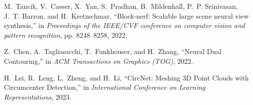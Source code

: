 \begin{thebibliography}{1}
M.~Tancik, V.~Casser, X.~Yan, S.~Pradhan, B.~Mildenhall, P.~P. Srinivasan,
  J.~T. Barron, and H.~Kretzschmar, ``Block-nerf: Scalable large scene neural
  view synthesis,'' in \emph{Proceedings of the IEEE/CVF conference on computer vision and pattern
  recognition}, pp. 8248--8258, 2022.

Z.~Chen, A.~Tagliasacchi, T.~Funkhouser, and H.~Zhang, 
  ``Neural Dual Contouring,'' in \emph{ACM Transactions on Graphics (TOG)}, 2022.

H.~Lei, R.~Leng, L.~Zheng, and H.~Li, ``CircNet: Meshing 3D Point Clouds with Circumcenter Detection,'' in \emph{International Conference on Learning Representations}, 2023.
\end{thebibliography}

